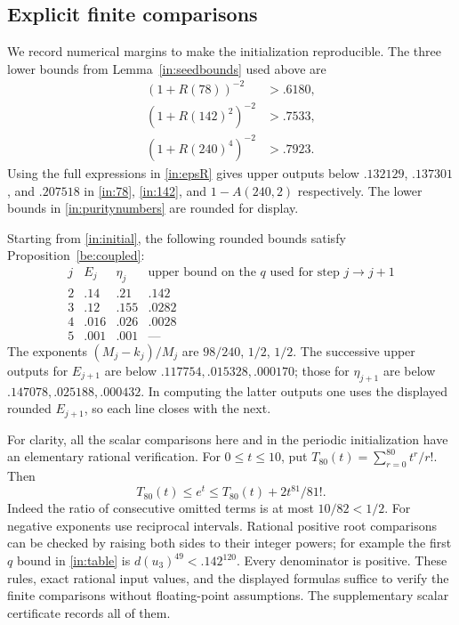 \documentclass[11pt]{article}
\theoremstyle{remark}
\numberwithin{equation}{section}
\begin{document}
\subsection{Explicit finite comparisons}
We record numerical margins to make the initialization reproducible.
The three lower bounds from Lemma~\ref{in:seedbounds} used above are
\begin{equation}\label{in:puritynumbers}
 \begin{split}
 (1+R(78))^{-2}&>.6180,\\
 (1+R(142)^2)^{-2}&>.7533,\\
 (1+R(240)^4)^{-2}&>.7923.
 \end{split}
\end{equation}
Using the full expressions in \eqref{in:epsR} gives upper outputs below
$.132129$, $.137301$, and $.207518$ in \eqref{in:78}, \eqref{in:142},
and $1-A(240,2)$ respectively. The lower bounds in
\eqref{in:puritynumbers} are rounded for display.

Starting from \eqref{in:initial}, the following rounded bounds satisfy
Proposition~\ref{be:coupled}:
\begin{equation}\label{in:table}
\begin{array}{c|cc|c}
 j&E_j&\eta_j&\text{upper bound on the $q$ used for step $j\to j+1$}\\\hline
 2&.14&.21&.142\\
 3&.12&.155&.0282\\
 4&.016&.026&.0028\\
 5&.001&.001&\text{---}
\end{array}
\end{equation}
The exponents $(M_j-k_j)/M_j$ are $98/240$, $1/2$, $1/2$.
The successive upper outputs for $E_{j+1}$ are below
$.117754,.015328,.000170$; those for $\eta_{j+1}$ are below
$.147078,.025188,.000432$. In computing the latter outputs one uses
the displayed rounded $E_{j+1}$, so each line closes with the next.

For clarity, all the scalar comparisons here and in the periodic
initialization have an elementary rational verification. For
$0\le t\le10$, put $T_{80}(t)=\sum_{r=0}^{80}t^r/r!$. Then
\begin{equation}\label{in:exp-enclosure}
 T_{80}(t)\le e^t\le T_{80}(t)+2t^{81}/81!.
\end{equation}
Indeed the ratio of consecutive omitted terms is at most $10/82<1/2$.
For negative exponents use reciprocal intervals. Rational positive
root comparisons can be checked by raising both sides to their
integer powers; for example the first $q$ bound in \eqref{in:table}
is $d(u_3)^{49}<.142^{120}$. Every denominator is positive.
These rules, exact rational input values, and the displayed formulas
suffice to verify the finite comparisons without floating-point
assumptions. The supplementary scalar certificate records all of them.
\end{document}
